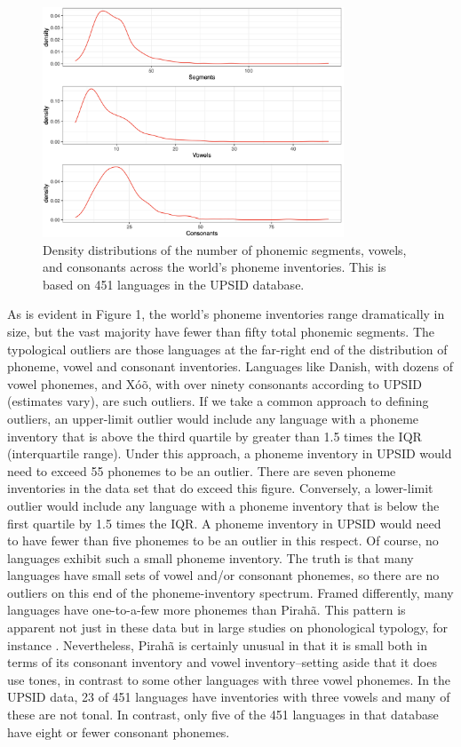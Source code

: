 \documentclass[output=paper,colorlinks,citecolor=brown
]{langscibook}
\begin{document}
    
\begin{figure}
\centering
\includegraphics[width=0.8\textwidth]{everett_figure1.png}
\caption{\label{fig:Figure 1}Density distributions of the number of phonemic segments, vowels, and consonants across the world’s phoneme inventories. This is based on 451 languages in the UPSID database.\cite{maddieson1989updating} }
\end{figure}
    As is evident in Figure 1, the world’s phoneme inventories range dramatically in size, but the vast majority have fewer than fifty total phonemic segments. The typological outliers are those languages at the far-right end of the distribution of phoneme, vowel and consonant inventories. Languages like Danish, with dozens of vowel phonemes, and Xóõ, with over ninety consonants according to UPSID (estimates vary), are such outliers. If we take a common approach to defining outliers, an upper-limit outlier would include any language with a phoneme inventory that is above the third quartile by greater than 1.5 times the IQR (interquartile range). Under this approach, a phoneme inventory in UPSID would need to exceed 55 phonemes to be an outlier. There are seven phoneme inventories in the data set that do exceed this figure. Conversely, a lower-limit outlier would include any language with a phoneme inventory that is below the first quartile by 1.5 times the IQR. A phoneme inventory in UPSID would need to have fewer than five phonemes to be an outlier in this respect. Of course, no languages exhibit such a small phoneme inventory. The truth is that many languages have small sets of vowel and/or consonant phonemes, so there are no outliers on this end of the phoneme-inventory spectrum. Framed differently, many languages have one-to-a-few more phonemes than Pirahã. This pattern is apparent not just in these data but in large studies on phonological typology, for instance \cite{gordon2016phonological}. Nevertheless, Pirahã is certainly unusual in that it is small both in terms of its consonant inventory and vowel inventory–setting aside that it does use tones, in contrast to some other languages with three vowel phonemes. In the UPSID data, 23 of 451 languages have inventories with three vowels and many of these are not tonal. In contrast, only five of the 451 languages in that database have eight or fewer consonant phonemes. 
    
\end{document}
